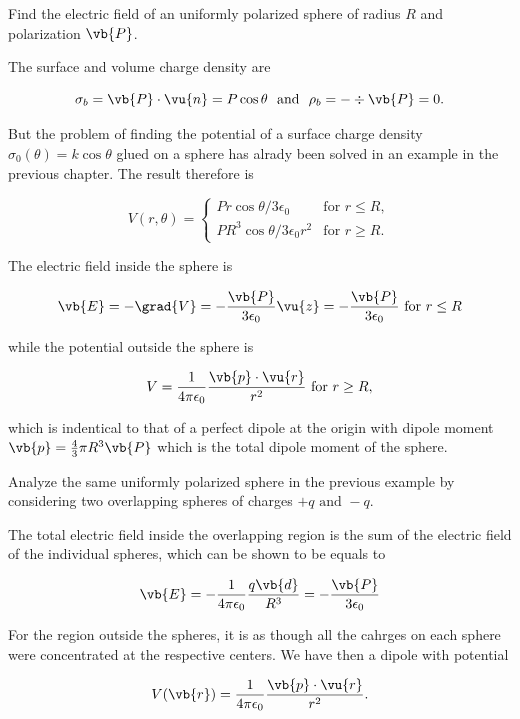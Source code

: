 \documentclass[english,a4paper,12pt]{report}
\begin{document}
{Find the electric field of an uniformly polarized sphere of radius \(R\) and polarization \(\vb{P} \).}
{The surface and volume charge density are

\begin{equation}
    \sigma _{b} = \vb{P} \cdot \vu{n} = P\cos \theta  ~\text { and }~ \rho _{b} = - \div{\vb{P} } = 0.  
\end{equation}

But the problem of finding the potential of a surface charge density \(\sigma _{0} (\theta ) = k\cos \theta  \) glued on a sphere has alrady been solved in an example in the previous chapter. The result therefore is

\begin{equation}
 V(r, \theta) =
    \begin{cases}
    Pr \cos \theta / 3\epsilon _{0}  & \text{for } r \leq R, \\[10pt]
    PR^3 \cos \theta /3\epsilon _{0}r^2  & \text{for } r \geq R.
    \end{cases}  
\end{equation}

The electric field inside the sphere is 

\begin{equation}
    \vb{E} = -\grad{V} = - \frac{\vb{P} }{3\epsilon _{0} }\vu{z} = - \frac{\vb{P} }{3 \epsilon _{0} } \text{ for } r \le R
\end{equation}

while the potential outside the sphere is 

\begin{equation}
    V = \frac{1}{4\pi \epsilon_0} \frac{\vb{p} \cdot \vu{r} }{r^2} \text{ for } r \ge R, 
\end{equation}

which is indentical to that of a perfect dipole at the origin with dipole moment \(\vb{p} = \frac{4}{3}\pi R^3 \vb{P}  \) which is the total dipole moment of the sphere. 
} 

{Analyze the same uniformly polarized sphere in the previous example by considering two overlapping spheres of charges \(+q\text { and } -q\).}
{The total electric field inside the overlapping region is the sum of the electric field of the individual spheres, which can be shown to be equals to

\begin{equation}
    \vb{E} = -\frac{1}{4\pi \epsilon_0} \frac{q\vb{d} }{R^3 } = -\frac{\vb{P} }{3\epsilon _{0} } 
\end{equation}

For the region outside the spheres, it is as though all the cahrges on each sphere were concentrated at the respective centers. We have then a dipole with potential 

\begin{equation}
    V(\vb{r} ) = \frac{1}{4\pi \epsilon_0} \frac{\vb{p} \cdot \vu{r} }{r^2}. 
\end{equation}
} 
\end{document}

